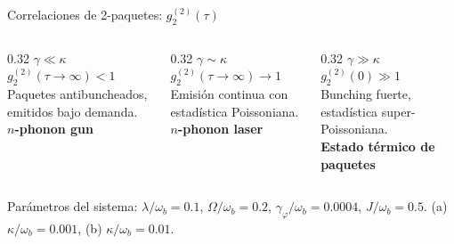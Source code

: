 \documentclass[
11pt,notheorems,hyperref={pdfauthor=whatever}
]{beamer}
\begin{document}
\begin{frame}{Correlaciones de 2-paquetes: $g_2^{(2)}(\tau)$}
	
	\vspace{-25pt}
	
	\begin{center}
		\resizebox{0.85\textwidth}{!}{%
		}
	\end{center}
	
	\begin{columns}[T]
		\begin{column}{0.32\textwidth}
			{\small
				$\gamma \ll \kappa$\\
				$g_2^{(2)}(\tau\to\infty) < 1$\\[6pt]
				Paquetes antibuncheados,
				emitidos bajo demanda.\\
				\textbf{$n$-phonon gun}
			}
		\end{column}
		\begin{column}{0.32\textwidth}
			{\small
				$\gamma \sim \kappa$\\
				$g_2^{(2)}(\tau\to\infty) \to 1$\\
				Emisión continua con
				estadística Poissoniana.\\
				\textbf{$n$-phonon laser}
			}
		\end{column}
		\begin{column}{0.32\textwidth}
			{\small
				$\gamma \gg \kappa$\\
				$g_2^{(2)}(0) \gg 1$\\
				Bunching fuerte,
				estadística super-Poissoniana.\\
				\textbf{Estado térmico de paquetes}
			}
		\end{column}
	\end{columns}
	
	\vspace{10pt}
	{\scriptsize
		Parámetros del sistema: $\lambda/\omega_b=0.1$, $\Omega/\omega_b=0.2$,
		$\gamma_\varphi/\omega_b=0.0004$, $J/\omega_b=0.5$.
		(a) $\kappa/\omega_b=0.001$, (b) $\kappa/\omega_b=0.01$.
	}
	
\end{frame}
\end{document}

